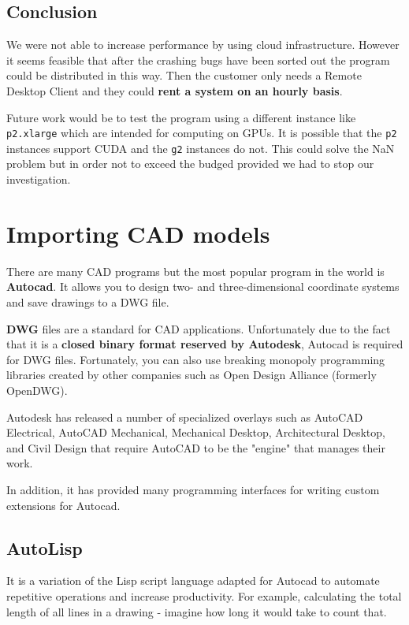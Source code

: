 \documentclass[a4paper, 11pt, article]{report}
\begin{document}
\subsection{Conclusion}

We were not able to increase performance by using cloud infrastructure. However it seems feasible that after the crashing bugs have been sorted out the program could be distributed in this way. Then the customer only needs a Remote Desktop Client and they could \textbf{rent a system on an hourly basis}. 

Future work would be to test the program using a different instance like \texttt{p2.xlarge} which are intended for computing on GPUs. It is possible that the \texttt{p2} instances support CUDA and the \texttt{g2} instances do not. This could solve the NaN problem but in order not to exceed the budged provided we had to stop our investigation.

\section{Importing CAD models}
   
There are many CAD programs but the most popular program in the world is \textbf{Autocad}. It allows you to design two- and three-dimensional coordinate systems and save drawings to a DWG file.

\textbf{DWG} files are a standard for CAD applications. Unfortunately due to the fact that it is a \textbf{closed binary format reserved by Autodesk}, Autocad is required for DWG files. Fortunately, you can also use breaking monopoly programming libraries created by other companies such as Open Design Alliance (formerly OpenDWG).

Autodesk has released a number of specialized overlays such as AutoCAD Electrical, AutoCAD Mechanical, Mechanical Desktop, Architectural Desktop, and Civil Design that require AutoCAD to be the "engine" that manages their work.

In addition, it has provided many programming interfaces for writing custom extensions for Autocad.

\subsection{AutoLisp}

It is a variation of the Lisp script language adapted for Autocad to automate repetitive operations and increase productivity. For example, calculating the total length of all lines in a drawing - imagine how long it would take to count that.
\end{document}
